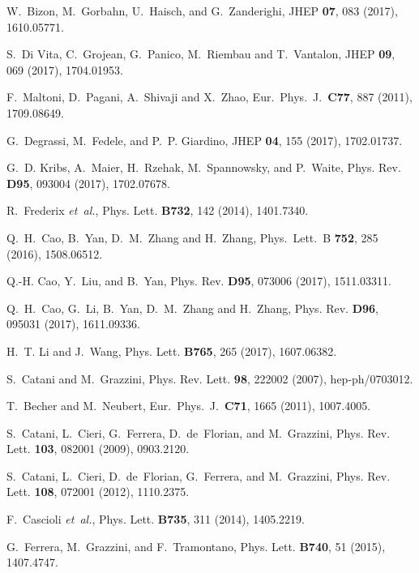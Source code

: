 \documentclass[a4paper,amsmath,preprintnumbers,showpacs,twocolumn,prl,superscriptaddress, nofootinbib]{revtex4}
\begin{document}
\begin{thebibliography}{100}
W.~Bizon, M.~Gorbahn, U.~Haisch, and G.~Zanderighi,
\newblock JHEP {\bf 07}, 083 (2017), 1610.05771.

  S.~Di Vita, C.~Grojean, G.~Panico, M.~Riembau and T.~Vantalon,
\newblock  JHEP {\bf 09}, 069 (2017),  1704.01953.

  F.~Maltoni, D.~Pagani, A.~Shivaji and X.~Zhao,
   \newblock Eur.\ Phys.\ J.\  {\bf C77}, 887 (2011),
1709.08649.

G.~Degrassi, M.~Fedele, and P.~P. Giardino,
\newblock JHEP {\bf 04}, 155 (2017), 1702.01737.

G.~D. Kribs, A.~Maier, H.~Rzehak, M.~Spannowsky, and P.~Waite,
\newblock Phys. Rev. {\bf D95}, 093004 (2017), 1702.07678.

R.~Frederix {\em et~al.},
\newblock Phys. Lett. {\bf B732}, 142 (2014), 1401.7340.

  Q.~H.~Cao, B.~Yan, D.~M.~Zhang and H.~Zhang,
\newblock  Phys.\ Lett.\ B {\bf 752}, 285 (2016), 1508.06512.

Q.-H. Cao, Y.~Liu, and B.~Yan,
\newblock Phys. Rev. {\bf D95}, 073006 (2017), 1511.03311.

  Q.~H.~Cao, G.~Li, B.~Yan, D.~M.~Zhang and H.~Zhang, 
  \newblock Phys. Rev. {\bf D96}, 095031 (2017), 1611.09336.

H.~T. Li and J.~Wang,
\newblock Phys. Lett. {\bf B765}, 265 (2017), 1607.06382.

S.~Catani and M.~Grazzini,
\newblock Phys. Rev. Lett. {\bf 98}, 222002 (2007), hep-ph/0703012.

  T.~Becher and M.~Neubert,
  \newblock Eur.\ Phys.\ J.\  {\bf C71}, 1665 (2011),
1007.4005.

S.~Catani, L.~Cieri, G.~Ferrera, D.~de~Florian, and M.~Grazzini,
\newblock Phys. Rev. Lett. {\bf 103}, 082001 (2009), 0903.2120.

S.~Catani, L.~Cieri, D.~de~Florian, G.~Ferrera, and M.~Grazzini,
\newblock Phys. Rev. Lett. {\bf 108}, 072001 (2012), 1110.2375.

F.~Cascioli {\em et~al.},
\newblock Phys. Lett. {\bf B735}, 311 (2014), 1405.2219.

G.~Ferrera, M.~Grazzini, and F.~Tramontano,
\newblock Phys. Lett. {\bf B740}, 51 (2015), 1407.4747.


\end{thebibliography}
\end{document}

